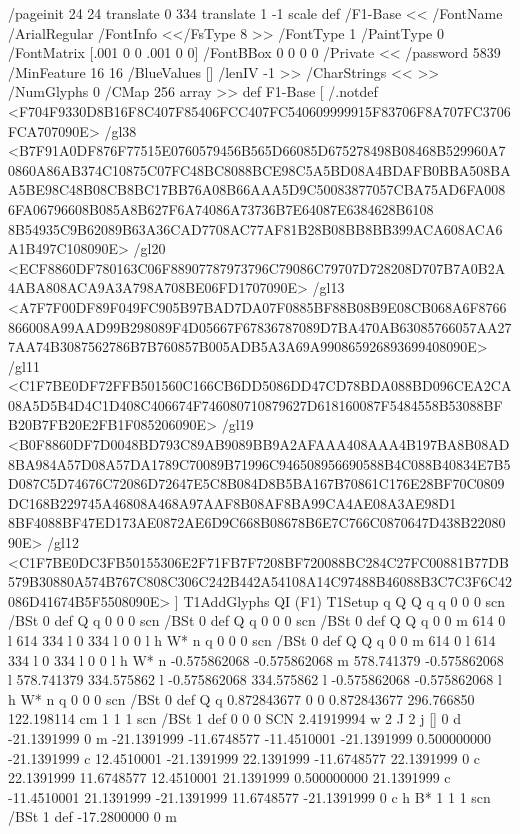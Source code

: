 /pageinit {
24 24 translate
0 334 translate 1 -1 scale } def
/F1-Base
<<
/FontName /ArialRegular
/FontInfo <</FsType 8 >>
/FontType 1
/PaintType 0
/FontMatrix [.001 0 0 .001 0 0]
/FontBBox { 0 0 0 0 }
/Private <<
/password 5839
/MinFeature {16 16}
/BlueValues []
/lenIV -1
>>
/CharStrings << >>
/NumGlyphs 0
/CMap 256 array
>> def
F1-Base [
/.notdef
<F704F9330D8B16F8C407F85406FCC407FC540609999915F83706F8A707FC3706FCA707090E>
/gl38 
<B7F91A0DF876F77515E0760579456B565D66085D675278498B08468B529960A70860A86AB374C10875C07FC48BC8088BCE98C5A5BD08A4BDAFB0BBA508BAA5BE98C48B08CB8BC17BB76A08B66AAA5D9C50083877057CBA75AD6FA0086FA06796608B085A8B627F6A74086A73736B7E64087E6384628B6108
8B54935C9B62089B63A36CAD7708AC77AF81B28B08BB8BB399ACA608ACA6A1B497C108090E>
/gl20 
<ECF8860DF780163C06F88907787973796C79086C79707D728208D707B7A0B2A4ABA808ACA9A3A798A708BE06FD1707090E>
/gl13 
<A7F7F00DF89F049FC905B97BAD7DA07F0885BF88B08B9E08CB068A6F8766866008A99AAD99B298089F4D05667F67836787089D7BA470AB63085766057AA277AA74B3087562786B7B760857B005ADB5A3A69A990865926893699408090E>
/gl11 
<C1F7BE0DF72FFB501560C166CB6DD5086DD47CD78BDA088BD096CEA2CA08A5D5B4D4C1D408C406674F746080710879627D618160087F5484558B53088BFB20B7FB20E2FB1F085206090E>
/gl19 
<B0F8860DF7D0048BD793C89AB9089BB9A2AFAAA408AAA4B197BA8B08AD8BA984A57D08A57DA1789C70089B71996C946508956690588B4C088B40834E7B5D087C5D74676C72086D72647E5C8B084D8B5BA167B70861C176E28BF70C0809DC168B229745A46808A468A97AAF8B08AF8BA99CA4AE08A3AE98D1
8BF4088BF47ED173AE0872AE6D9C668B08678B6E7C766C0870647D438B2208090E>
/gl12 
<C1F7BE0DC3FB50155306E2F71FB7F7208BF720088BC284C27FC00881B77DB579B30880A574B767C808C306C242B442A54108A14C97488B46088B3C7C3F6C42086D41674B5F5508090E>
] T1AddGlyphs
QI
(F1) T1Setup
q
Q
Q q
q
0 0 0 scn
/BSt 0 def
Q
q
0 0 0 scn
/BSt 0 def
Q
q
0 0 0 scn
/BSt 0 def
Q
Q q
0 0 m
614 0 l
614 334 l
0 334 l
0 0 l
h
W* n
q
0 0 0 scn
/BSt 0 def
Q
Q q
0 0 m
614 0 l
614 334 l
0 334 l
0 0 l
h
W* n
-0.575862068 -0.575862068 m
578.741379 -0.575862068 l
578.741379 334.575862 l
-0.575862068 334.575862 l
-0.575862068 -0.575862068 l
h
W* n
q
0 0 0 scn
/BSt 0 def
Q
q
0.872843677 0 0 0.872843677 296.766850 122.198114 cm
1 1 1 scn
/BSt 1 def
0 0 0 SCN
2.41919994 w 2 J 2 j [] 0 d
-21.1391999 0 m
-21.1391999 -11.6748577 -11.4510001 -21.1391999 0.500000000 -21.1391999 c
12.4510001 -21.1391999 22.1391999 -11.6748577 22.1391999 0 c
22.1391999 11.6748577 12.4510001 21.1391999 0.500000000 21.1391999 c
-11.4510001 21.1391999 -21.1391999 11.6748577 -21.1391999 0 c
h
B*
1 1 1 scn
/BSt 1 def
-17.2800000 0 m
